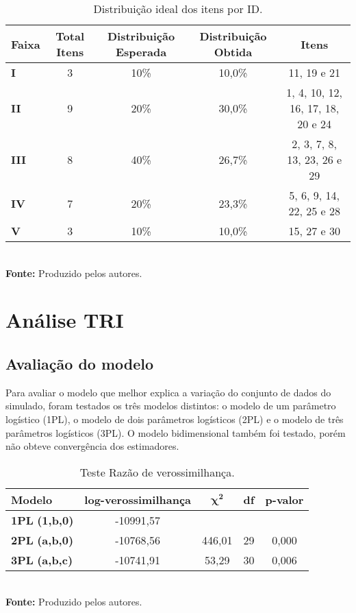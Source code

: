\begin{table}[H]
	\centering
		\caption{Distribuição ideal dos itens por ID.}
		\label{tabela-dificuldade-obtida}
		\begin{tabular}{lcccc}
			\hline
				\textbf{Faixa} & \textbf{Total Itens} &\textbf{ Distribuição Esperada} & \textbf{Distribuição Obtida}  & \textbf{Itens} \\ 
			\hline
			 \textbf{I} & 3 & 10\% &  10,0\% & 11, 19 e 21\\ 
			\hline
			\textbf{II} & 9 & 20\% &  30,0\% & 1, 4, 10, 12, 16, 17, 18, 20 e 24 \\
			\hline
			\textbf{III} & 8 & 40\% & 26,7\% & 2, 3, 7, 8, 13, 23, 26 e 29 \\ 
			\hline
			 \textbf{IV}& 7 & 20\% & 23,3\%  & 5, 6, 9, 14, 22, 25 e 28\\ 
			\hline
			 \textbf{V} & 3 & 10\% & 10,0\% & 15, 27 e 30\\ 
			\hline
		\end{tabular}\\
		\vspace*{0.5cm}
		\small{\textbf{Fonte:} Produzido pelos autores.}
\end{table}



\section{Análise TRI}

\subsection{Avaliação do modelo}

Para avaliar o modelo que melhor explica a variação do conjunto de dados do simulado, foram testados os três modelos distintos: o modelo de um parâmetro logístico (1PL), o modelo de dois parâmetros logísticos (2PL) e o modelo de três parâmetros logísticos (3PL). O modelo bidimensional também foi testado, porém não obteve convergência dos estimadores. 

\begin{table}[!htb]
	\centering
		\caption{Teste Razão de verossimilhança.}
		\label{tabela-anova}
		\begin{tabular}{lcccc}
			\hline
			\textbf{Modelo} &  \textbf{ log-verossimilhança }& $\boldsymbol{\chi^2}$ & \textbf{df} &\textbf{ p-valor }\\ 
			\hline
			\textbf{1PL} \textbf{(1,b,0)} &  -10991,57 &  &  &  \\ 
			\hline
			\textbf{2PL} \textbf{(a,b,0)} & -10768,56 & 446,01 & 29 & 0,000 \\ 
			\hline
			\textbf{3PL} \textbf{(a,b,c)} & -10741,91 & 53,29 & 30 & 0,006 \\ 
			\hline
		\end{tabular}\\
		\vspace*{0.5cm}
		\small{\textbf{Fonte:} Produzido pelos autores.}
\end{table}



